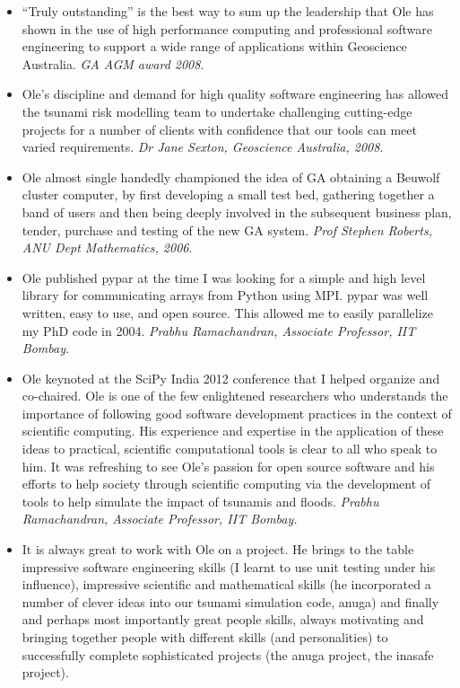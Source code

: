 \documentclass[11pt,a4paper]{article}
\begin{document}
\begin{itemize}
  \item “Truly outstanding” is the best way to sum up the leadership that Ole has shown in the use of high performance computing and professional software engineering to support a wide range of applications within Geoscience Australia. \emph{GA AGM award 2008}.
  \item Ole’s discipline and demand for high quality software engineering has allowed the tsunami risk modelling team to undertake challenging cutting-edge projects for a number of clients with confidence that our tools can meet varied requirements. \emph{Dr Jane Sexton, Geoscience Australia, 2008}.
  \item Ole almost single handedly championed the idea of GA obtaining a Beuwolf cluster computer, by first developing a small test bed, gathering together a band of users and then being deeply involved in the subsequent business plan, tender, purchase and testing of the new GA system. \emph{Prof Stephen Roberts, ANU Dept Mathematics, 2006}.
  \item Ole published pypar at the time I was looking for a simple and high level library for communicating arrays from Python using MPI.  pypar was well written, easy to use, and open source.  This allowed me to easily parallelize my PhD code in 2004.
    \emph{Prabhu Ramachandran, Associate Professor, IIT Bombay}.
  \item Ole keynoted at the SciPy India 2012 conference that I helped organize and co-chaired.  Ole is one of the few enlightened researchers who understands the importance of following good software development practices in the context of scientific computing.  His experience and expertise in the application of these ideas to practical, scientific computational tools is clear to all who speak to him.  It was refreshing to see Ole's passion for open source software and his efforts to help society through scientific computing via the development of tools to help simulate the impact of tsunamis and floods.
    \emph{Prabhu Ramachandran, Associate Professor, IIT Bombay.} 
  \item It is always great to work with Ole on a project. He brings to the table impressive software engineering skills (I learnt to use unit testing under his influence), impressive scientific and mathematical skills (he incorporated a number of clever ideas into our tsunami simulation code, anuga) and finally and perhaps most importantly great people skills, always motivating and bringing together people with different skills (and personalities) to successfully complete sophisticated projects (the anuga project, the inasafe project).

\end{itemize}
\end{document}
